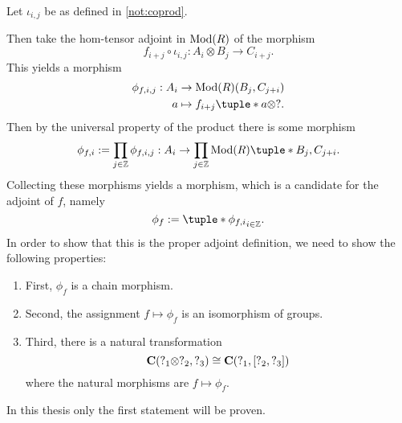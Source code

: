 \begin{remark}
\begin{center}
    \end{center}

    Let \( \iota_{i, j} \) be as defined in \autoref{not:coprod}.

    Then take the hom-tensor adjoint in \( \operatorname{Mod}(R) \) of the morphism
    \[
        f_{i + j} \circ \iota_{i, j}: A_i \otimes B_j \to C_{i + j}.
    \]
    This yields a morphism
    \begin{align*}
        \phi_{f, i, j}: A_i &\to \Mod(R)(B_j, C_{j + i}) \\
        a &\mapsto f_{i + j}\tuple*{ a \otimes ? }.
    \end{align*}
    Then by the universal property of the product there is some morphism
    \[
        \phi_{f, i} := \prod_{j \in \Zb} \phi_{f, i, j}: A_i \to \prod_{j \in \Zb} \Mod(R)\tuple*{B_j, C_{j + i}}.
    \]
    Collecting these morphisms yields a morphism, which is a candidate for the adjoint of \( f \), namely
    \[
        \phi_f := \tuple*{\phi_{f, i}}_{i \in \Zb}.
    \]
    In order to show that this is the proper adjoint definition, we need to show the following properties:
    \begin{enumerate}
        \item {
            First, \( \phi_f \) is a chain morphism.
        }
        \item {
            Second, the assignment \( f \mapsto \phi_f \) is an isomorphism of groups.
        }
        \item {
            Third, there is a natural transformation
            \[
                \operatorname{\mathbf{C}}(?_1 \otimes ?_2, ?_3) \cong \operatorname{\mathbf{C}}(?_1, \left[ ?_2, ?_3 \right])
            \]
            where the natural morphisms are \( f \mapsto \phi_f \).
        }
    \end{enumerate}
    In this thesis only the first statement will be proven.


\end{remark}
